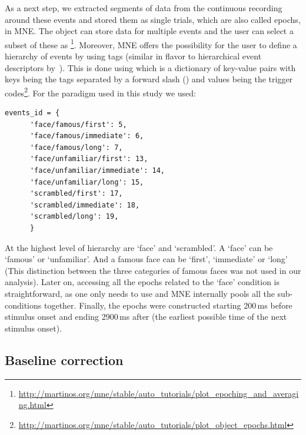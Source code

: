 As a next step, we extracted segments of data from the continuous recording around these events and stored them as single trials, which are also called epochs, in MNE. The  object can store data for multiple events and the user can select a subset of these as \footnote{\url{http://martinos.org/mne/stable/auto_tutorials/plot_epoching_and_averaging.html}}. Moreover, MNE offers the possibility for the user to define a hierarchy of events by using tags (similar in flavor to hierarchical event descriptors by~\cite{bigdely2013hierarchical}). This is done using  which is a dictionary of key-value pairs with keys being the tags separated by a forward slash (\code{\//}) and values being the trigger codes\footnote{\url{http://martinos.org/mne/stable/auto_tutorials/plot_object_epochs.html}}. For the paradigm used in this study we used:
      \begin{lstlisting}[]
      events_id = {
      'face/famous/first': 5,
      'face/famous/immediate': 6,
      'face/famous/long': 7,
      'face/unfamiliar/first': 13,
      'face/unfamiliar/immediate': 14,
      'face/unfamiliar/long': 15,
      'scrambled/first': 17,
      'scrambled/immediate': 18,
      'scrambled/long': 19,
      }
      \end{lstlisting}
At the highest level of hierarchy are `face' and `scrambled'. A `face' can be `famous' or `unfamiliar'. And a famous face can be `first', `immediate' or `long' (This distinction between the three categories of famous faces was not used in our analysis). Later on, accessing all the epochs related to the `face' condition is straightforward, as one only needs to use  and MNE internally pools all the sub-conditions together.
Finally, the epochs were constructed starting 200\,ms before stimulus onset and ending 2900\,ms after (the earliest possible time of the next stimulus onset).

   
\subsection{Baseline correction}
\label{sec:baseline}


